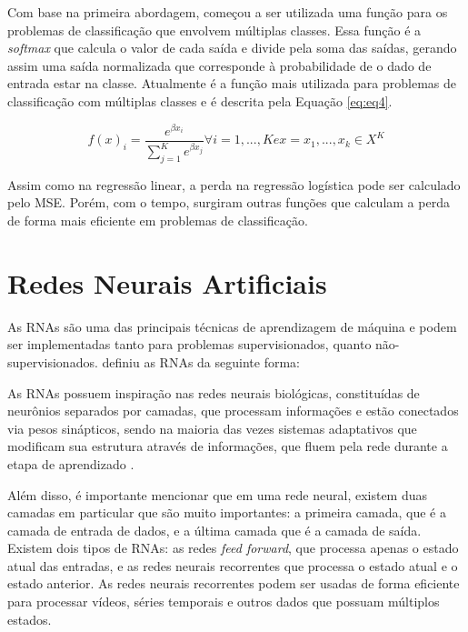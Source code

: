 Com base na primeira abordagem, começou a ser utilizada uma função para os problemas de classificação que envolvem múltiplas classes. Essa função é a \textit{softmax} que calcula o valor de cada saída e divide pela soma das saídas, gerando assim uma saída normalizada que corresponde à probabilidade de o dado de entrada estar na classe. Atualmente é a função mais utilizada para problemas de classificação com múltiplas classes e é descrita pela Equação  \ref{eq:eq4}.

\begin{equation}
\label{eq:eq4}
	f(x)_i = \dfrac{e^{\beta x_i}}{\sum_{j = 1}^{K}e^{\beta x_j}} \forall i = 1,...,K e x = {x_1, ... ,x_k} \in X^K
\end{equation}

Assim como na regressão linear, a perda na regressão logística pode ser calculado pelo \ac{MSE}. Porém, com o tempo, surgiram outras funções que calculam a perda de forma mais eficiente em problemas de classificação.

\section{Redes Neurais Artificiais}
\label{secao:2:2}

As \ac{RNA}s são uma das principais técnicas de aprendizagem de máquina e podem ser implementadas tanto para problemas supervisionados, quanto não-supervisionados.  definiu as \ac{RNA}s da seguinte forma:

\begin{citacao}
	As \ac{RNA}s possuem inspiração nas redes neurais biológicas, constituídas de neurônios separados por camadas, que processam informações e estão conectados via pesos sinápticos, sendo na maioria das vezes sistemas adaptativos que modificam sua estrutura através de informações, que fluem pela rede durante a etapa de aprendizado \cite{jost-2015}.
\end{citacao}

Além disso, é importante mencionar que em uma rede neural, existem duas camadas em particular que são muito importantes: a primeira camada, que é a camada de entrada de dados, e a última camada que é a camada de saída. Existem dois tipos de \ac{RNA}s: as redes \textit{feed forward}, que processa apenas o estado atual das entradas, e as redes neurais recorrentes que processa o estado atual e o estado anterior. As redes neurais recorrentes podem ser usadas de forma eficiente para processar vídeos, séries temporais e outros dados que possuam múltiplos estados.

